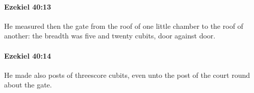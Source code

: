 		\paragraph{Ezekiel 40:13} %
			\label{EZEKIEL-40-13}

			He measured then the gate from the roof of one little chamber to the roof of another: the breadth was five and twenty cubits, door against door.


		\paragraph{Ezekiel 40:14} %
			\label{EZEKIEL-40-14}

			He made also posts of threescore cubits, even unto the post of the court round about the gate.


